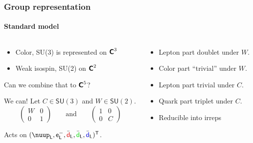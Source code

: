 \documentclass[english, fleqn]{beamer}
\newcommand\qqandqq{\qquad\text{and}\qquad}
\begin{document}
\begin{frame}
    \frametitle{Group representation}
    \framesubtitle{Standard model}

    \begin{columns}[t]
        \begin{column}{.55\textwidth}

            \begin{itemize}
                \item Color, SU(3) is represented on $\text{\bfseries\sffamily{C}}^3$
                \item Weak isospin, SU(2) on $\text{\bfseries\sffamily{C}}^2$
            \end{itemize}

            Can we combine that to $\text{\bfseries\sffamily{C}}^5$?

            \pause

            We can! Let $C \in \mathsf{SU}(3)$ and $W \in \mathsf{SU}(2)$.
            \pause
            \[
                \begin{pmatrix}
                    W & 0 \\
                    0 & 1
                \end{pmatrix}
                \qqandqq
                \begin{pmatrix}
                    1 & 0 \\
                    0 & C
                \end{pmatrix}
            \]

            Acts on $(\nuup_\mathsf L, \mathsf e^-_\mathsf L,
            \bar{\textcolor{qred}{\mathsf d}}_\mathsf L,
            \bar{\textcolor{qgreen}{\mathsf d}}_\mathsf L,
            \bar{\textcolor{qblue}{\mathsf d}}_\mathsf L)^\mathsf T$.
        \end{column}
        \pause
        \begin{column}{.45\textwidth}
            \begin{itemize}
                \item Lepton part doublet under $W$.
                \item Color part \enquote{trivial} under $W$.
                \item Lepton part trivial under $C$.
                \item Quark part triplet under $C$.
                \item Reducible into irreps
            \end{itemize}
        \end{column}
    \end{columns}
\end{frame}
\end{document}
